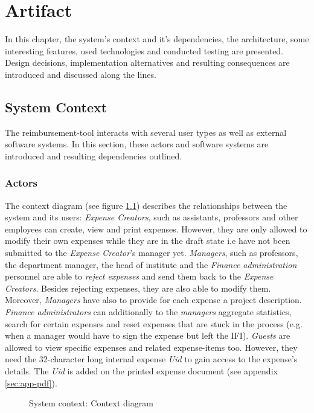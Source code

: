 \chapter{Artifact}

In this chapter, the system's context and it's dependencies, the architecture, some interesting features, used technologies and conducted testing are presented. Design decisions, implementation alternatives and resulting consequences are introduced and discussed along the lines.

\section{System Context}

The reimbursement-tool interacts with several user types as well as external software systems. In this section, these actors and software systems are introduced and resulting dependencies outlined.

\subsection{Actors}

The context diagram (see figure \ref{fig:context-diagram}) describes the relationships between the system and its users:
\textit{Expense Creators}, such as assistants, professors and other employees can create, view and print expenses. However, they are only allowed to modify their own expenses while they are in the draft state i.e have not been submitted to the \textit{Expense Creator}'s manager yet.  \textit{Managers}, such as professors, the department manager, the head of institute and the \textit{Finance administration} personnel are able to \textit{reject expenses} and send them back to the \textit{Expense Creators}. Besides rejecting expenses, they are also able to modify them. Moreover, \textit{Managers} have also to provide for each expense a project description. \textit{Finance administrators} can additionally to the \textit{managers} aggregate statistics, search for certain expenses and reset expenses that are stuck in the process (e.g. when a manager would have to sign the expense but left the IFI). \textit{Guests} are allowed to view specific expenses and related expense-items too. However, they need the 32-character long internal expense \textit{Uid} to gain access to the expense's details. The \textit{Uid} is added on the printed expense document (see appendix \ref{sec:app-pdf}).

\begin{figure}[H]
	\centering
	\caption{System context: Context diagram}
	\label{fig:context-diagram}
\end{figure}

